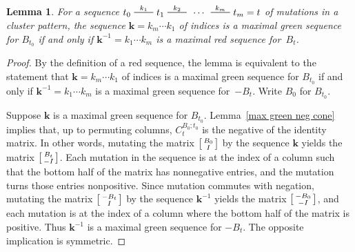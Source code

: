 \documentclass{amsart}
\newtheorem{lemma}[proposition]{Lemma}
\theoremstyle{definition}
\theoremstyle{remark}
\numberwithin{equation}{section}
\newcommand{\edge}{\,\,\rule[2.7pt]{20pt}{0.5pt}\,\,}
\newcommand{\I}{{\mathcal I}}
\newcommand{\0}{{\mathbf{0}}}
\newcommand{\kk}{{\boldsymbol{k}}}
\begin{document}
\begin{lemma}\label{max red green}
For a sequence $t_0\overset{k_1}{\edge}t_1\overset{k_2}{\edge}\,\cdots\,\overset{k_m}{\edge}t_m=t$ of mutations in a cluster pattern, the sequence $\kk=k_m\cdots k_1$ of indices is a maximal green sequence for $B_{t_0}$ if and only if $\kk^{-1}=k_1\cdots k_m$ is a maximal red sequence for~$B_t$.
\end{lemma}
\begin{proof}
By the definition of a red sequence, the lemma is equivalent to the statement that  $\kk=k_m\cdots k_1$ of indices is a maximal green sequence for $B_{t_0}$ if and only if $\kk^{-1}=k_1\cdots k_m$ is a maximal green sequence for~$-B_t$.
Write $B_0$ for $B_{t_0}$.

Suppose $\kk$ is a maximal green sequence for $B_{t_0}$.
Lemma~\ref{max green neg cone} implies that, up to permuting columns, $C_t^{B_0;t_0}$ is the negative of the identity matrix.
In other words, mutating the matrix $\begin{bsmallmatrix}B_0\\I\end{bsmallmatrix}$ by the sequence $\kk$ yields the matrix $\begin{bsmallmatrix}B_t\\-I\end{bsmallmatrix}$.
Each mutation in the sequence is at the index of a column such that the bottom half of the matrix has nonnegative entries, and the mutation turns those entries nonpositive.
Since mutation commutes with negation, mutating the matrix $\begin{bsmallmatrix}-B_t\\I\end{bsmallmatrix}$ by the sequence $\kk^{-1}$ yields the matrix $\begin{bsmallmatrix}-B_0\\-I\end{bsmallmatrix}$, and each mutation is at the index of a column where the bottom half of the matrix is positive.
Thus $\kk^{-1}$ is a maximal green sequence for $-B_t$.
The opposite implication is symmetric.
\end{proof}
\end{document}

